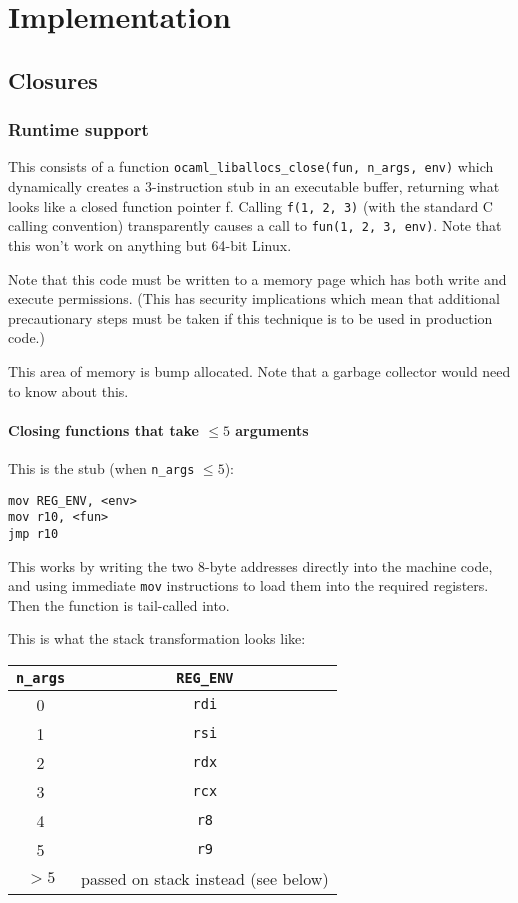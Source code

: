 \documentclass[12pt,a4paper,twoside,openright]{report}
\begin{document}


\chapter{Implementation}

\section{Closures}

\subsection{Runtime support}

This consists of a function \lstinline{ocaml_liballocs_close(fun, n_args, env)}
which dynamically creates a 3-instruction stub in an executable buffer,
returning what looks like a closed function pointer f. Calling
\lstinline{f(1, 2, 3)}
(with the standard C calling convention) transparently causes a call to
\lstinline{fun(1, 2, 3, env)}.
Note that this won't work on anything but 64-bit Linux.

Note that this code must be written to a memory page which has both write and execute permissions. (This has security implications which mean that additional precautionary steps must be taken if this technique is to be used in production code.)

This area of memory is bump allocated. Note that a garbage collector would need to know about this.

\subsubsection{Closing functions that take $\le 5$ arguments}

This is the stub (when \lstinline{n_args} $\le 5$):

\begin{lstlisting}
mov REG_ENV, <env>
mov r10, <fun>
jmp r10
\end{lstlisting}

This works by writing the two 8-byte addresses directly into the machine code, and using immediate \lstinline{mov} instructions to load them into the required registers. Then the function is tail-called into.

This is what the stack transformation looks like: %

\begin{tabular}{ c | c }
  \lstinline!n_args! & \lstinline!REG_ENV! \\
  \hline
  0 & \lstinline!rdi! \\
  1 & \lstinline!rsi! \\
  2 & \lstinline!rdx! \\
  3 & \lstinline!rcx! \\
  4 & \lstinline!r8! \\
  5 & \lstinline!r9! \\
  $> 5$ & passed on stack instead (see below) \\
\end{tabular}
\end{document}
